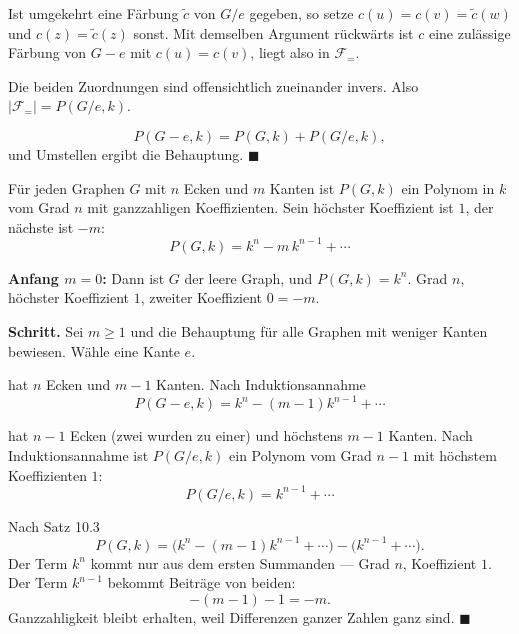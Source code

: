 \begin{merksatz}
 Ist umgekehrt eine Färbung $\tilde{c}$ von $G/e$ gegeben, so setze $c(u) = c(v) = \tilde{c}(w)$ und $c(z) = \tilde{c}(z)$ sonst. Mit demselben Argument rückwärts ist $c$ eine zulässige Färbung von $G-e$ mit $c(u)=c(v)$, liegt also in $\mathcal{F}_{=}$.

Die beiden Zuordnungen sind offensichtlich zueinander invers. Also $|\mathcal{F}_{=}| = P(G/e, k)$.

\[ P(G-e,k) = P(G,k) + P(G/e,k) , \]
und Umstellen ergibt die Behauptung. $\blacksquare$

\begin{center}
\begin{minipage}{0.88\textwidth}
\end{minipage}
\end{center}
\end{merksatz}

\begin{merksatz}
Für jeden Graphen $G$ mit $n$ Ecken und $m$ Kanten ist $P(G,k)$ ein Polynom in $k$ vom Grad $n$ mit ganzzahligen Koeffizienten. Sein höchster Koeffizient ist $1$, der nächste ist $-m$:
\[ P(G,k) = k^n - m\,k^{n-1} + \cdots \]

\textbf{Anfang $m = 0$:} Dann ist $G$ der leere Graph, und $P(G,k) = k^n$. Grad $n$, höchster Koeffizient $1$, zweiter Koeffizient $0 = -m$. \checkmark

\textbf{Schritt.} Sei $m \ge 1$ und die Behauptung für alle Graphen mit weniger Kanten bewiesen. Wähle eine Kante $e$.

 hat $n$ Ecken und $m-1$ Kanten. Nach Induktionsannahme
\[ P(G-e,k) = k^n - (m-1)k^{n-1} + \cdots \]

 hat $n-1$ Ecken (zwei wurden zu einer) und höchstens $m-1$ Kanten. Nach Induktionsannahme ist $P(G/e,k)$ ein Polynom vom Grad $n-1$ mit höchstem Koeffizienten $1$:
\[ P(G/e,k) = k^{n-1} + \cdots \]

 Nach Satz 10.3
\[ P(G,k) = \bigl(k^n - (m-1)k^{n-1} + \cdots\bigr) - \bigl(k^{n-1} + \cdots\bigr) . \]
Der Term $k^n$ kommt nur aus dem ersten Summanden --- Grad $n$, Koeffizient $1$. Der Term $k^{n-1}$ bekommt Beiträge von beiden:
\[ -(m-1) - 1 = -m . \]
Ganzzahligkeit bleibt erhalten, weil Differenzen ganzer Zahlen ganz sind. $\blacksquare$
\end{merksatz}

